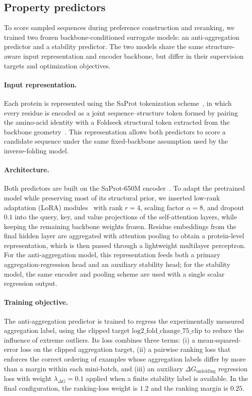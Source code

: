 \documentclass[pdflatex,sn-mathphys-num]{sn-jnl}%
\theoremstyle{thmstyleone}%
\theoremstyle{thmstyletwo}%
\theoremstyle{thmstylethree}%
\begin{document}
\subsection{Property predictors}\label{sec:predictors}

To score sampled sequences during preference construction and reranking, we trained two frozen backbone-conditioned surrogate models: an anti-aggregation predictor and a stability predictor. The two models share the same structure-aware input representation and encoder backbone, but differ in their supervision targets and optimization objectives.

\paragraph{Input representation.}
Each protein is represented using the SaProt tokenization scheme~\cite{saprot}, in which every residue is encoded as a joint sequence--structure token formed by pairing the amino-acid identity with a Foldseek structural token extracted from the backbone geometry~\cite{foldseek}. This representation allows both predictors to score a candidate sequence under the same fixed-backbone assumption used by the inverse-folding model.

\paragraph{Architecture.}
Both predictors are built on the SaProt-650M encoder~\cite{saprot}. To adapt the pretrained model while preserving most of its structural prior, we inserted low-rank adaptation (LoRA) modules~\cite{hu2022lora} with rank $r=4$, scaling factor $\alpha=8$, and dropout $0.1$ into the query, key, and value projections of the self-attention layers, while keeping the remaining backbone weights frozen. Residue embeddings from the final hidden layer are aggregated with attention pooling to obtain a protein-level representation, which is then passed through a lightweight multilayer perceptron. For the anti-aggregation model, this representation feeds both a primary aggregation-regression head and an auxiliary stability head; for the stability model, the same encoder and pooling scheme are used with a single scalar regression output.

\paragraph{Training objective.}
The anti-aggregation predictor is trained to regress the experimentally measured aggregation label, using the clipped target $\mathrm{log2\_fold\_change\_75\_clip}$ to reduce the influence of extreme outliers. Its loss combines three terms: (i) a mean-squared-error loss on the clipped aggregation target, (ii) a pairwise ranking loss that enforces the correct ordering of examples whose aggregation labels differ by more than a margin within each mini-batch, and (iii) an auxiliary $\Delta G_{\mathrm{unfolding}}$ regression loss with weight $\lambda_{\Delta G}=0.1$ applied when a finite stability label is available. In the final configuration, the ranking-loss weight is $1.2$ and the ranking margin is $0.25$.
\end{document}

